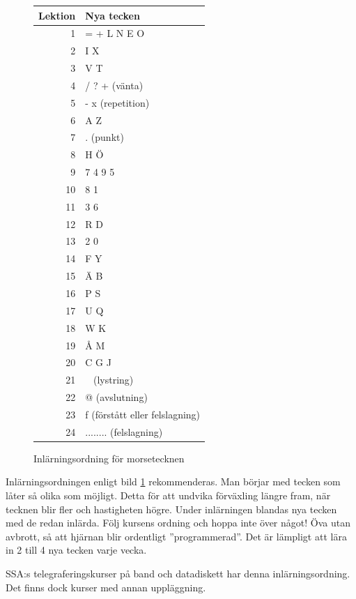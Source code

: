 \begin{figure}
  \begin{tabular}{|r|l|}
    \hline
    \textbf{Lektion} & \textbf{Nya tecken} \\ \hline
    1 & = + L N E O \\
    2 & I X \\
    3 & V T \\
    4 & / ? + (vänta) \\
    5 & - x (repetition) \\
    6 & A Z \\
    7 & . (punkt) \\
    8 & H Ö \\
    9 & 7 4 9 5 \\
    10 & 8 1 \\
    11 & 3 6 \\
    12 & R D \\
    13 & 2 0 \\
    14 & F Y \\
    15 & Ä B \\
    16 & P S \\
    17 & U Q \\
    18 & W K \\
    19 & Å M \\
    20 & C G J \\
    21 & ~ (lystring) \\
    22 & @ (avslutning) \\
    23 & f (förstått eller felslagning) \\
    24 & ........ (felslagning) \\
    \hline
  \end{tabular}
  \caption{Inlärningsordning för morsetecknen}
  \label{fig:morse_ordning}
\end{figure}

Inlärningsordningen enligt bild \ref{fig:morse_ordning} rekommenderas. Man börjar med tecken som låter
så olika som möjligt. Detta för att undvika förväxling längre fram, när tecknen
blir fler och hastigheten högre. Under inlärningen blandas nya tecken med de
redan inlärda. Följ kursens ordning och hoppa inte över något! Öva utan avbrott,
så att hjärnan blir ordentligt ''programmerad''. Det är lämpligt att lära in 2
till 4 nya tecken varje vecka.

SSA:s telegraferingskurser på band och datadiskett har denna inlärningsordning.
Det finns dock kurser med annan uppläggning.


